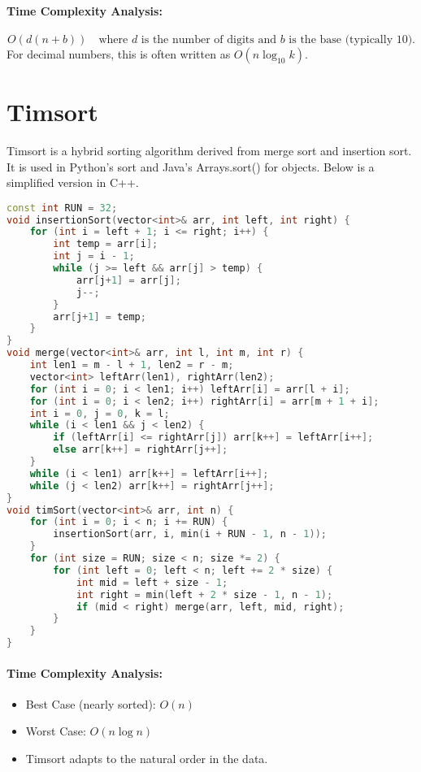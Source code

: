 \paragraph{Time Complexity Analysis:}
\[
O(d(n + b)) \quad \text{where } d \text{ is the number of digits and } b \text{ is the base (typically 10).}
\]
For decimal numbers, this is often written as \(O(n \log_{10} k)\).

\section{Timsort}
Timsort is a hybrid sorting algorithm derived from merge sort and insertion sort. It is used in Python’s sort and Java’s Arrays.sort() for objects. Below is a simplified version in C++.

\begin{lstlisting}[language=C++, caption={Timsort Implementation (Simplified)}]
const int RUN = 32;
void insertionSort(vector<int>& arr, int left, int right) {
    for (int i = left + 1; i <= right; i++) {
        int temp = arr[i];
        int j = i - 1;
        while (j >= left && arr[j] > temp) {
            arr[j+1] = arr[j];
            j--;
        }
        arr[j+1] = temp;
    }
}
void merge(vector<int>& arr, int l, int m, int r) {
    int len1 = m - l + 1, len2 = r - m;
    vector<int> leftArr(len1), rightArr(len2);
    for (int i = 0; i < len1; i++) leftArr[i] = arr[l + i];
    for (int i = 0; i < len2; i++) rightArr[i] = arr[m + 1 + i];
    int i = 0, j = 0, k = l;
    while (i < len1 && j < len2) {
        if (leftArr[i] <= rightArr[j]) arr[k++] = leftArr[i++];
        else arr[k++] = rightArr[j++];
    }
    while (i < len1) arr[k++] = leftArr[i++];
    while (j < len2) arr[k++] = rightArr[j++];
}
void timSort(vector<int>& arr, int n) {
    for (int i = 0; i < n; i += RUN) {
        insertionSort(arr, i, min(i + RUN - 1, n - 1));
    }
    for (int size = RUN; size < n; size *= 2) {
        for (int left = 0; left < n; left += 2 * size) {
            int mid = left + size - 1;
            int right = min(left + 2 * size - 1, n - 1);
            if (mid < right) merge(arr, left, mid, right);
        }
    }
}
\end{lstlisting}

\paragraph{Time Complexity Analysis:}
\begin{itemize}
  \item Best Case (nearly sorted): \(O(n)\)
  \item Worst Case: \(O(n \log n)\)
  \item Timsort adapts to the natural order in the data.
\end{itemize}

